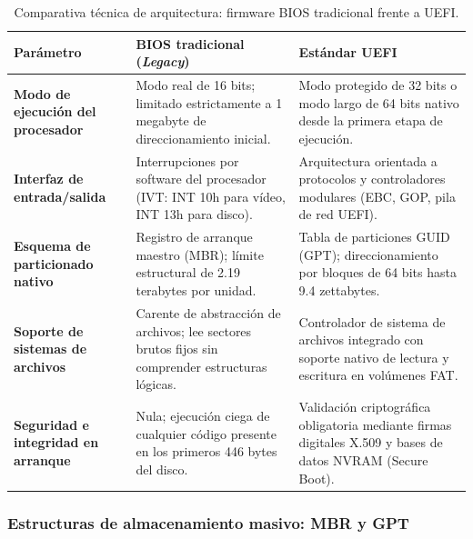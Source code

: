 \documentclass[12pt]{article}
\begin{document}
\begin{table}[htbp]
\centering
\small
\renewcommand{\arraystretch}{1.15}
\renewcommand{\tabularxcolumn}[1]{m{#1}}
\setlength{\emergencystretch}{1.5em}
\caption{Comparativa técnica de arquitectura: firmware BIOS tradicional frente a UEFI.}
\label{tab:comparativaBiosUefi}
\begin{tabularx}{\textwidth}{>{\centering\arraybackslash}m{2.8cm} X X}
\toprule
\textbf{Parámetro} & \textbf{BIOS tradicional (\textit{Legacy})} & \textbf{Estándar UEFI} \\
\midrule
\textbf{Modo de ejecución del procesador} & Modo real de 16 bits; limitado estrictamente a 1 megabyte de direccionamiento inicial. & Modo protegido de 32 bits o modo largo de 64 bits nativo desde la primera etapa de ejecución. \\
\addlinespace
\textbf{Interfaz de entrada/salida} & Interrupciones por software del procesador (IVT: INT 10h para vídeo, INT 13h para disco). & Arquitectura orientada a protocolos y controladores modulares (EBC, GOP, pila de red UEFI). \\
\addlinespace
\textbf{Esquema de particionado nativo} & Registro de arranque maestro (MBR); límite estructural de 2.19 terabytes por unidad. & Tabla de particiones GUID (GPT); direccionamiento por bloques de 64 bits hasta 9.4 zettabytes. \\
\addlinespace
\textbf{Soporte de sistemas de archivos} & Carente de abstracción de archivos; lee sectores brutos fijos sin comprender estructuras lógicas. & Controlador de sistema de archivos integrado con soporte nativo de lectura y escritura en volúmenes FAT. \\
\addlinespace
\textbf{Seguridad e integridad en arranque} & Nula; ejecución ciega de cualquier código presente en los primeros 446 bytes del disco. & Validación criptográfica obligatoria mediante firmas digitales X.509 y bases de datos NVRAM (Secure Boot). \\
\bottomrule
\end{tabularx}
\end{table}

\subsubsection{Estructuras de almacenamiento masivo: MBR y GPT}
\end{document}
